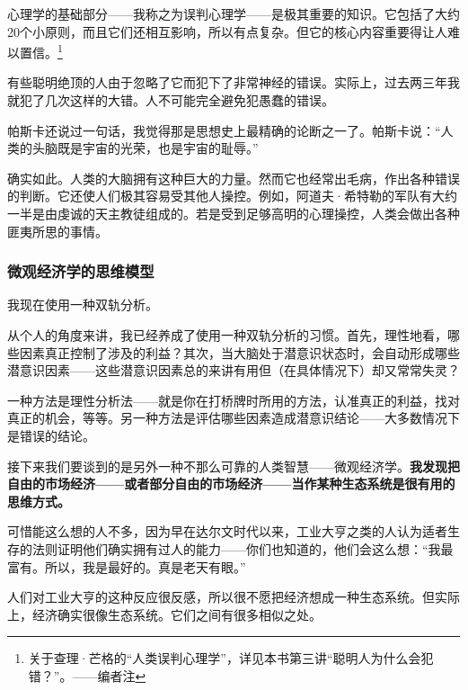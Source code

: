 心理学的基础部分——我称之为误判心理学——是极其重要的知识。它包括了大约20个小原则，而且它们还相互影响，所以有点复杂。但它的核心内容重要得让人难以置信。\footnote{关于查理·芒格的“人类误判心理学”，详见本书第三讲“聪明人为什么会犯错？”。——编者注}
\par

有些聪明绝顶的人由于忽略了它而犯下了非常神经的错误。实际上，过去两三年我就犯了几次这样的大错。人不可能完全避免犯愚蠢的错误。
\par

帕斯卡还说过一句话，我觉得那是思想史上最精确的论断之一了。帕斯卡说：“人类的头脑既是宇宙的光荣，也是宇宙的耻辱。”
\par

确实如此。人类的大脑拥有这种巨大的力量。然而它也经常出毛病，作出各种错误的判断。它还使人们极其容易受其他人操控。例如，阿道夫·希特勒的军队有大约一半是由虔诚的天主教徒组成的。若是受到足够高明的心理操控，人类会做出各种匪夷所思的事情。
\par

\subsubsection*{微观经济学的思维模型}

我现在使用一种双轨分析。
\par

从个人的角度来讲，我已经养成了使用一种双轨分析的习惯。首先，理性地看，哪些因素真正控制了涉及的利益？其次，当大脑处于潜意识状态时，会自动形成哪些潜意识因素——这些潜意识因素总的来讲有用但（在具体情况下）却又常常失灵？
\par

一种方法是理性分析法——就是你在打桥牌时所用的方法，认准真正的利益，找对真正的机会，等等。另一种方法是评估哪些因素造成潜意识结论——大多数情况下是错误的结论。
\par

接下来我们要谈到的是另外一种不那么可靠的人类智慧——微观经济学。\textbf{我发现把自由的市场经济——或者部分自由的市场经济——当作某种生态系统是很有用的思维方式。}
\par

可惜能这么想的人不多，因为早在达尔文时代以来，工业大亨之类的人认为适者生存的法则证明他们确实拥有过人的能力——你们也知道的，他们会这么想：“我最富有。所以，我是最好的。真是老天有眼。”
\par

人们对工业大亨的这种反应很反感，所以很不愿把经济想成一种生态系统。但实际上，经济确实很像生态系统。它们之间有很多相似之处。
\par

